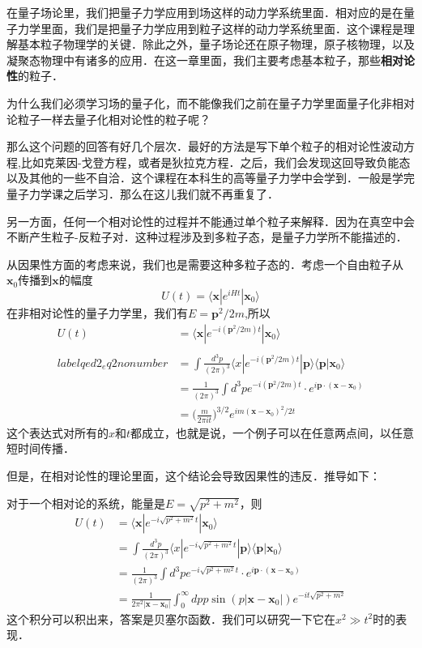 
在量子场论里，我们把量子力学应用到场这样的动力学系统里面．相对应的是在量子力学里面，我们是把量子力学应用到粒子这样的动力学系统里面．这个课程是理解基本粒子物理学的关键．除此之外，量子场论还在原子物理，原子核物理，以及凝聚态物理中有诸多的应用．在这一章里面，我们主要考虑基本粒子，那些\textbf{相对论性}的粒子．

为什么我们必须学习场的量子化，而不能像我们之前在量子力学里面量子化非相对论粒子一样去量子化相对论性的粒子呢？

那么这个问题的回答有好几个层次．最好的方法是写下单个粒子的相对论性波动方程,比如克莱因-戈登方程，或者是狄拉克方程．之后，我们会发现这回导致负能态以及其他的一些不自洽．这个课程在本科生的高等量子力学中会学到．一般是学完量子力学课之后学习．那么在这儿我们就不再重复了．

另一方面，任何一个相对论性的过程并不能通过单个粒子来解释．因为在真空中会不断产生粒子-反粒子对．这种过程涉及到多粒子态，是量子力学所不能描述的．

从因果性方面的考虑来说，我们也是需要这种多粒子态的．考虑一个自由粒子从$\mathbf x_0$传播到$\mathbf x$的幅度
\begin{equation}
U(t) = \langle \mathbf x | e^{i H t} | \mathbf x_0 \rangle
\end{equation}
在非相对论性的量子力学里，我们有$E = \mathbf p^2/2m$,所以
\begin{align}\nonumber
U(t) & = \langle \mathbf x | e^{-i(\mathbf p^2/2m)t}|\mathbf x_0\rangle \\\\label{qed2_eq2}nonumber
& = \int \frac{d^3 p}{(2\pi)^3} \langle x | e^{-i(\mathbf p^2/2m)t} | \mathbf p \rangle \langle \mathbf p | \mathbf x_0 \rangle \\\nonumber
& = \frac{1}{(2\pi)^3} \int d^3 p e^{- i (\mathbf p^2/2m)t}\cdot e^{i\mathbf p \cdot (\mathbf x - \mathbf x_0) } \\
& = \bigg( \frac{m}{2\pi it} \bigg)^{3/2} e^{im(\mathbf x - \mathbf x_0)^2/2t}
\end{align}
这个表达式对所有的$x$和$t$都成立，也就是说，一个例子可以在任意两点间，以任意短时间传播．

但是，在相对论性的理论里面，这个结论会导致因果性的违反．推导如下：

对于一个相对论的系统，能量是$E = \sqrt{p^2+m^2}$，则
\begin{align}\nonumber
U(t) & = \langle \mathbf x | e^{-i\sqrt{p^2+m^2}t}|\mathbf x_0\rangle \\\nonumber
& = \int \frac{d^3 p}{(2\pi)^3} \langle x | e^{-i\sqrt{p^2+m^2}t} | \mathbf p \rangle \langle \mathbf p | \mathbf x_0 \rangle \\\nonumber
& = \frac{1}{(2\pi)^3} \int d^3 p e^{- i \sqrt{p^2+m^2} t}\cdot e^{i\mathbf p \cdot (\mathbf x - \mathbf x_0) } \\
& =  \frac{1}{2\pi^2|\mathbf x - \mathbf x_0|}
\int _0^\infty d p p \sin(p|\mathbf x - \mathbf x_0|) e^{-it \sqrt{p^2+m^2}}
\end{align}
这个积分可以积出来，答案是贝塞尔函数．我们可以研究一下它在$x^2\gg t^2$时的表现．

